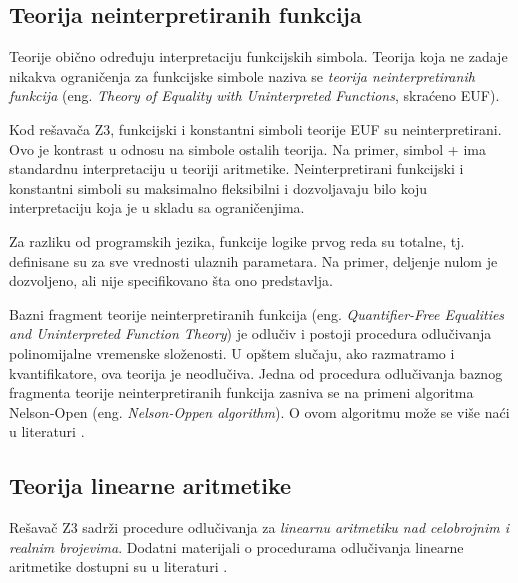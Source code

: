 \documentclass[12pt,oneside]{memoir}
\begin{document}
\subsection{Teorija neinterpretiranih funkcija}
Teorije obično određuju interpretaciju funkcijskih simbola. Teorija koja ne zadaje nikakva ograničenja za funkcijske simbole naziva se \emph{teorija neinterpretiranih funkcija}
(eng. \textit{Theory of Equality with Uninterpreted Functions}, skraćeno EUF). \par 
Kod rešavača Z3, funkcijski i konstantni simboli teorije EUF su neinterpretirani. Ovo je kontrast u odnosu na simbole ostalih teorija. Na primer, simbol + ima standardnu interpretaciju u teoriji aritmetike. Neinterpretirani funkcijski i konstantni simboli su maksimalno fleksibilni i dozvoljavaju bilo koju interpretaciju koja je u skladu sa ograničenjima. \par
Za razliku od programskih jezika, funkcije logike prvog reda su totalne, tj. definisane su za sve vrednosti ulaznih parametara. Na primer, deljenje nulom je dozvoljeno, ali nije specifikovano šta ono predstavlja. 
\par
Bazni fragment teorije neinterpretiranih funkcija (eng. \textit{Quantifier-Free Equalities and Uninterpreted Function Theory}) je odlučiv i postoji procedura odlučivanja polinomijalne vremenske složenosti. U opštem slučaju, ako razmatramo i kvantifikatore, ova teorija je neodlučiva. Jedna od procedura odlučivanja baznog fragmenta teorije neinterpretiranih funkcija zasniva se na primeni algoritma Nelson-Open (eng. \textit{Nelson-Oppen algorithm}). O ovom algoritmu može se više naći u literaturi \cite{NelsonOpen}.
\subsection{Teorija linearne aritmetike} 

Rešavač Z3 sadrži procedure odlučivanja za \emph{linearnu aritmetiku nad celobrojnim i realnim brojevima}. Dodatni materijali o procedurama odlučivanja linearne aritmetike dostupni su u literaturi \cite{FastLinearArithmetic}.
\par
\end{document}
